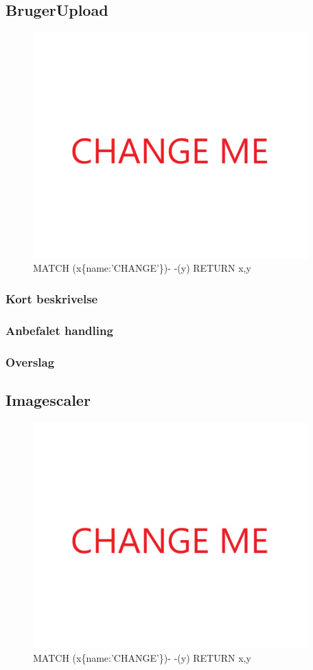 \documentclass{article}
\begin{document}
\subsection{BrugerUpload}
\begin{figure}[h]
\includegraphics[width=300pt]{CHANGE.PNG}
\caption{MATCH (x\{name:'CHANGE'\})- -(y) RETURN x,y}
\end{figure}
\subsubsection{Kort beskrivelse}
\subsubsection{Anbefalet handling}
\subsubsection{Overslag}


\subsection{Imagescaler}
\begin{figure}[h]
\includegraphics[width=300pt]{CHANGE.PNG}
\caption{MATCH (x\{name:'CHANGE'\})- -(y) RETURN x,y}
\end{figure}
\end{document}
